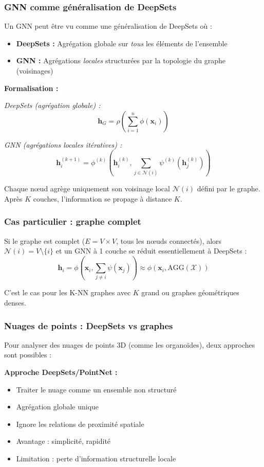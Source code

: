 \subsubsection{GNN comme généralisation de DeepSets}

Un GNN peut être vu comme une généralisation de DeepSets où :
\begin{itemize}
    \item \textbf{DeepSets :} Agrégation globale sur \textit{tous} les éléments de l'ensemble
    \item \textbf{GNN :} Agrégations \textit{locales} structurées par la topologie du graphe (voisinages)
\end{itemize}

\textbf{Formalisation :}

\textit{DeepSets (agrégation globale) :}
\[
\mathbf{h}_G = \rho\left(\sum_{i=1}^n \phi(\mathbf{x}_i)\right)
\]

\textit{GNN (agrégations locales itératives) :}
\[
\mathbf{h}_i^{(k+1)} = \phi^{(k)}\left(\mathbf{h}_i^{(k)}, \sum_{j \in \mathcal{N}(i)} \psi^{(k)}(\mathbf{h}_j^{(k)})\right)
\]

Chaque nœud agrège uniquement son voisinage local $\mathcal{N}(i)$ défini par le graphe. Après $K$ couches, l'information se propage à distance $K$.

\subsubsection{Cas particulier : graphe complet}

Si le graphe est complet ($E = V \times V$, tous les nœuds connectés), alors $\mathcal{N}(i) = V \setminus \{i\}$ et un GNN à 1 couche se réduit essentiellement à DeepSets :
\[
\mathbf{h}_i = \phi\left(\mathbf{x}_i, \sum_{j \neq i} \psi(\mathbf{x}_j)\right) \approx \phi(\mathbf{x}_i, \text{AGG}(\mathcal{X}))
\]

C'est le cas pour les K-NN graphes avec $K$ grand ou graphes géométriques denses.

\subsubsection{Nuages de points : DeepSets vs graphes}

Pour analyser des nuages de points 3D (comme les organoïdes), deux approches sont possibles :

\textbf{Approche DeepSets/PointNet :}
\begin{itemize}
    \item Traiter le nuage comme un ensemble non structuré
    \item Agrégation globale unique
    \item Ignore les relations de proximité spatiale
    \item Avantage : simplicité, rapidité
    \item Limitation : perte d'information structurelle locale
\end{itemize}

